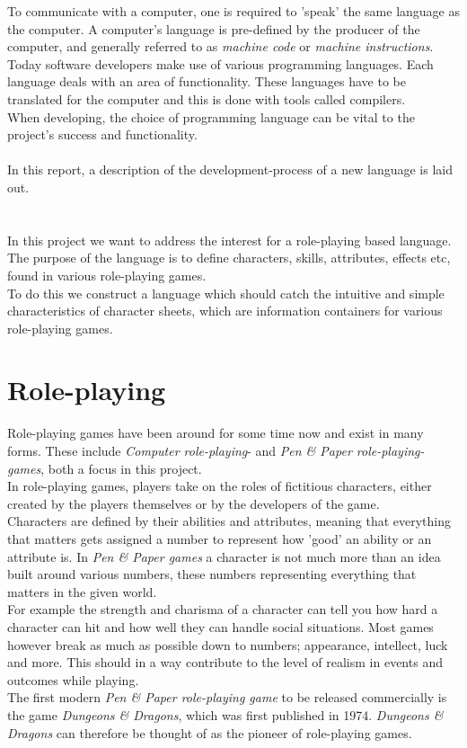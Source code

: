 
To communicate with a computer, one is required to 'speak' the same language as the computer. A computer's language is pre-defined by the producer of the computer, and generally referred to as \emph{machine code} or \emph{machine instructions}.\\
Today software developers make use of various programming languages. Each language deals with an area of functionality. These languages have to be translated for the computer and this is done with tools called compilers.\\
When developing, the choice of programming language can be vital to the project's success and functionality.\\\\
In this report, a description of the development-process of a new language is laid out.

\section{\langname{}}
In this project we want to address the interest for a role-playing based language. The purpose of the language is to define characters, skills, attributes, effects etc,  found in various role-playing games.\\
To do this we construct a language which should catch the intuitive and simple characteristics of character sheets, which are information containers for various role-playing games.

\section{Role-playing}
Role-playing games have been around for some time now and exist in many forms.
These include \emph{Computer role-playing}- and \emph{Pen \& Paper role-playing-games}, both a focus in this project.\\
In role-playing games, players take on the roles of fictitious characters, either created by the players themselves or by the developers of the game.\\
Characters are defined by their abilities and attributes, meaning that everything that matters gets assigned a number to represent how 'good' an ability or an attribute is. In \emph{Pen \& Paper games} a character is not much more than an idea built around various numbers, these numbers representing everything that matters in the given world.\\ For example the strength and charisma of a character can tell you how hard a character can hit and how well they can handle social situations. Most games however break as much as possible down to numbers; appearance, intellect, luck and more.
This should in a way contribute to the level of realism in events and outcomes while playing.\\
The first modern \emph{Pen \& Paper role-playing game} to be released commercially is the game \emph{Dungeons \& Dragons}, which was first published in 1974.\cite{wikidnd}
\emph{Dungeons \& Dragons} can therefore be thought of as the pioneer of role-playing games.
